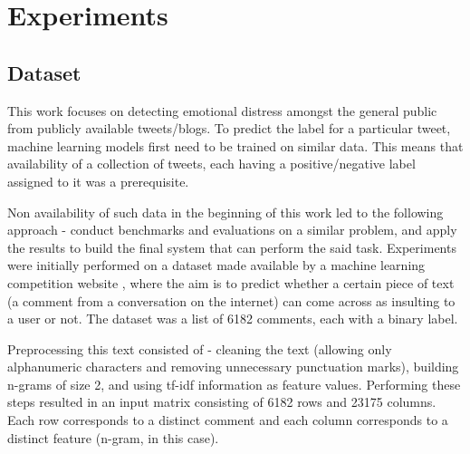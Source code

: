 \chapter{Experiments}
\label{chapter:Experiments}


\section{Dataset}
This work focuses on detecting emotional distress amongst the general public from publicly available tweets/blogs. To predict the label for a particular tweet, machine learning models first need to be trained on similar data. This means that availability of a collection of tweets, each having a positive/negative label assigned to it was a prerequisite.

Non availability of such data in the beginning of this work led to the following approach - conduct benchmarks and evaluations on a similar problem, and apply the results to build the final system that can perform the said task. Experiments were initially performed on a dataset made available by a machine learning competition website \cite{kaggle}, where the aim is to predict whether a certain piece of text (a comment from a conversation on the internet) can come across as insulting to a user or not. The dataset was a list of 6182 comments, each with a binary label.

Preprocessing this text consisted of - cleaning the text (allowing only alphanumeric characters and removing unnecessary punctuation marks), building n-grams of size 2, and using tf-idf information as feature values. Performing these steps resulted in an input matrix consisting of 6182 rows and 23175 columns. Each row corresponds to a distinct comment and each column corresponds to a distinct feature (n-gram, in this case).

